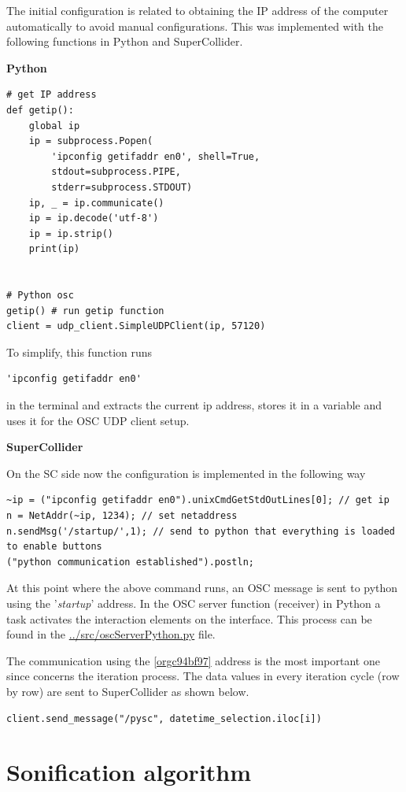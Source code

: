 \documentclass[11pt]{article}
\begin{document}
The initial configuration is related to obtaining the IP address of the computer automatically to avoid manual configurations.  This was implemented with the following functions in Python and SuperCollider.

\textbf{Python}

\begin{verbatim}
# get IP address
def getip():
    global ip
    ip = subprocess.Popen(
        'ipconfig getifaddr en0', shell=True,
        stdout=subprocess.PIPE,
        stderr=subprocess.STDOUT)
    ip, _ = ip.communicate()
    ip = ip.decode('utf-8')
    ip = ip.strip()
    print(ip)


# Python osc
getip() # run getip function
client = udp_client.SimpleUDPClient(ip, 57120)
\end{verbatim}

To simplify, this function runs
\begin{verbatim}
'ipconfig getifaddr en0'
\end{verbatim}
in the terminal and extracts the current ip address, stores it in a variable and uses it for the OSC UDP client setup.

\textbf{SuperCollider}

On the SC side now the configuration is implemented in the following way
\begin{verbatim}
~ip = ("ipconfig getifaddr en0").unixCmdGetStdOutLines[0]; // get ip
n = NetAddr(~ip, 1234); // set netaddress
n.sendMsg('/startup/',1); // send to python that everything is loaded to enable buttons
("python communication established").postln;
\end{verbatim}

At this point where the above command runs, an OSC message is sent to python using the '\emph{startup}' address.  In the OSC server function (receiver) in Python a task activates the interaction elements on the interface.  This process can be found in the \url{../src/oscServerPython.py} file.

The communication using the \ref{orgc94bf97} address is the most important one since concerns the iteration process.  The data values in every iteration cycle (row by row) are sent to SuperCollider as shown below.

\begin{verbatim}
client.send_message("/pysc", datetime_selection.iloc[i])
\end{verbatim}
\section{Sonification algorithm}
\label{sec:orgfe518da}
\end{document}
